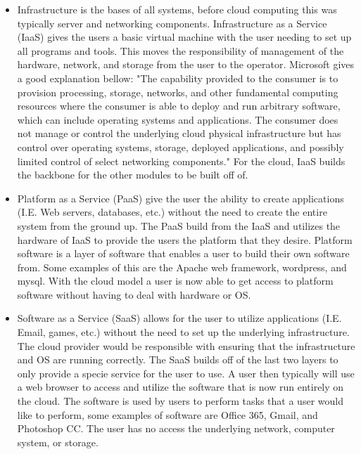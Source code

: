 \documentclass[12pt]{article}
\begin{document}
\begin{itemize}
    \item Infrastructure is the bases of all systems, before cloud computing this was typically server and networking components. Infrastructure as a Service (IaaS) gives the users a basic virtual machine with the user needing to set up all programs and tools. This moves the responsibility of management of the hardware, network, and storage from the user to the operator.  Microsoft gives a good explanation bellow: "The capability provided to the consumer is to provision processing, storage, networks, and other fundamental computing resources where the consumer is able to deploy and run arbitrary software, which can include operating systems and applications. The consumer does not manage or control the underlying cloud physical infrastructure but has control over operating systems, storage, deployed applications, and possibly limited control of select networking components." \cite{TechWikiMic} For the cloud, IaaS builds the backbone for the other modules to be built off of.

    \item Platform as a Service (PaaS) give the user the ability to create applications (I.E. Web servers, databases, etc.) without the need to create the entire system from the ground up. The PaaS build from the IaaS and utilizes the hardware of IaaS to provide the users the platform that they desire. Platform software is a layer of software that enables a user to build their own software from. Some examples of this are the Apache web framework, wordpress, and mysql. With the cloud model a user is now able to get access to platform software without having to deal with hardware or OS.

    \item Software as a Service (SaaS) allows for the user to utilize applications (I.E. Email, games, etc.) without the need to set up the underlying infrastructure. The cloud provider would be responsible with ensuring that the infrastructure and OS are running correctly. The SaaS builds off of the last two layers to only provide a specie service for the user to use. A user then typically will use a web browser to access and utilize the software that is now run entirely on the cloud. The software is used by users to perform tasks that a user would like to perform, some examples of software are Office 365, Gmail, and Photoshop CC.  The user has no access the underlying network, computer system, or storage.

\end{itemize}
\end{document}
